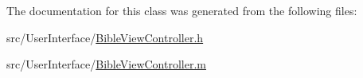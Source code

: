 The documentation for this class was generated from the following files\-:\begin{DoxyCompactItemize}
\item 
src/\-User\-Interface/\hyperlink{_bible_view_controller_8h}{Bible\-View\-Controller.\-h}\item 
src/\-User\-Interface/\hyperlink{_bible_view_controller_8m}{Bible\-View\-Controller.\-m}\end{DoxyCompactItemize}
